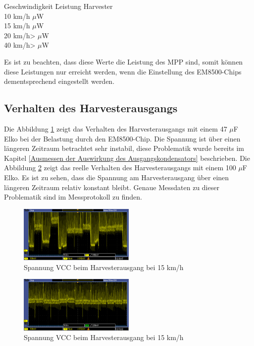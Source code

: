 \begin{tabbing}
    Geschwindigkeit \quad\= Leistung Harvester \\[0.8ex]
    10 km/h    $\mu$W \\
    15 km/h    $\mu$W \\
    20 km/h>  $\mu$W \\
    40 km/h>  $\mu$W \\
\end{tabbing}  

Es ist zu beachten, dass diese Werte die Leistung des MPP sind, somit können diese Leistungen nur erreicht werden, wenn die Einstellung des EM8500-Chips dementsprechend eingestellt werden.


\newpage  %
\subsection{Verhalten des Harvesterausgangs}

Die Abbildung \ref{resultat_Harvester_Spannung_47uF} zeigt das Verhalten des Harvesterausgangs mit einem 47 $\mu$F Elko bei der Belastung durch den EM8500-Chip. Die Spannung ist über einen längeren Zeitraum betrachtet sehr instabil, diese Problematik wurde bereits im Kapitel \ref{Ausmessen der Auswirkung des Ausgangskondensators} beschrieben. Die Abbildung \ref{resultat_Harvester_Spannung_100uF} zeigt das reelle Verhalten des Harvesterausgangs mit einem 100 $\mu$F Elko. Es ist zu sehen, dass die Spannung am Harvesterausgang über einen längeren Zeitraum relativ konstant bleibt. Genaue Messdaten zu dieser Problematik sind im Messprotokoll  zu finden.

\begin{figure}[ht]
    \includegraphics[width=0.5\textwidth]{4Resultate/imag/SpannungVCC_47uF.png} 
    \caption{Spannung VCC beim Harvesterausgang bei 15 km/h}
    \label{resultat_Harvester_Spannung_47uF}
\end{figure}

\begin{figure}[ht]
    \includegraphics[width=0.5\textwidth]{4Resultate/imag/SpannungVCC_100uF.png} 
    \caption{Spannung VCC beim Harvesterausgang bei 15 km/h}
    \label{resultat_Harvester_Spannung_100uF}
\end{figure}

